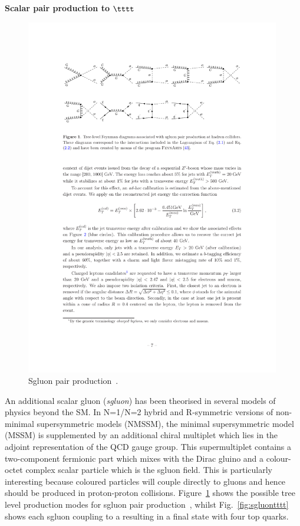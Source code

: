 

\textbf{Scalar pair production to }$\boldsymbol{\tttt}$\\

\begin{figure}[ht!]
\centering
    \includegraphics[width=0.99\textwidth]{images/Theory/sgluonFeyn.pdf}
    \caption{Sgluon pair production~\cite{Calvet:2012rk}.}
    \label{fig:sgluonpair}
\end{figure}

An additional scalar gluon (\emph{sgluon}) has been theorised in several models of physics beyond the SM. In N=1/N=2 hybrid and R-symmetric versions of non-minimal supersymmetric models (NMSSM), the minimal supersymmetric model (MSSM) is supplemented by an additional chiral multiplet which lies in the adjoint representation of the QCD gauge group. This supermultiplet contains a two-component fermionic part which mixes with the Dirac gluino and a colour-octet complex scalar particle which is the sgluon field. This is particularly interesting because coloured particles will couple directly to gluons and hence should be produced in proton-proton collisions. Figure~\ref{fig:sgluonpair} shows the possible tree level production modes for sgluon pair production~\cite{Calvet:2012rk}, whilst Fig.~\ref{fig:sgluontttt} shows each sgluon coupling to a \ttbar resulting in a final state with four top quarks.


